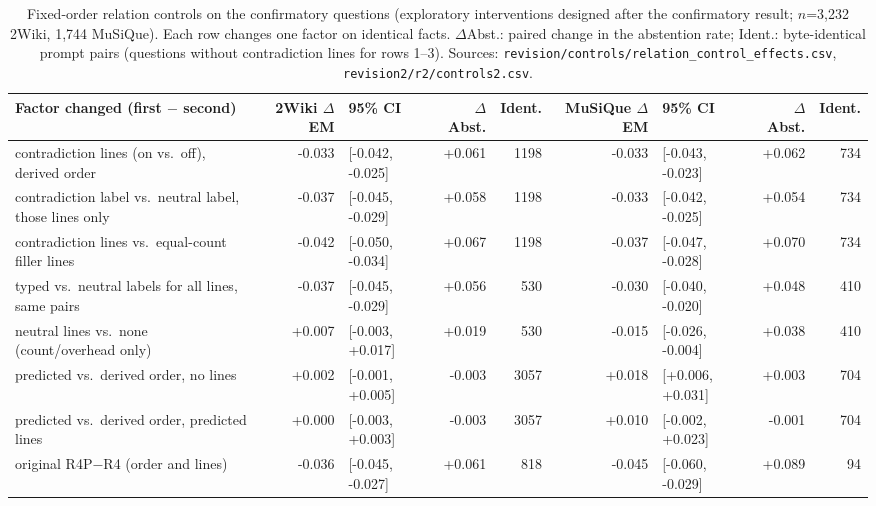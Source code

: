 \begin{table}[t]
\centering
\footnotesize
\begin{adjustbox}{max width=\linewidth}
\begin{tabular}{@{}lrlrrrlrr@{}}
\toprule
Factor changed (first $-$ second) & 2Wiki $\Delta$EM & 95\% CI & $\Delta$Abst. & Ident. & MuSiQue $\Delta$EM & 95\% CI & $\Delta$Abst. & Ident. \\
\midrule
contradiction lines (on vs.\ off), derived order & -0.033 & [-0.042, -0.025] & +0.061 & 1198 & -0.033 & [-0.043, -0.023] & +0.062 & 734 \\
contradiction label vs.\ neutral label, those lines only & -0.037 & [-0.045, -0.029] & +0.058 & 1198 & -0.033 & [-0.042, -0.025] & +0.054 & 734 \\
contradiction lines vs.\ equal-count filler lines & -0.042 & [-0.050, -0.034] & +0.067 & 1198 & -0.037 & [-0.047, -0.028] & +0.070 & 734 \\
typed vs.\ neutral labels for all lines, same pairs & -0.037 & [-0.045, -0.029] & +0.056 & 530 & -0.030 & [-0.040, -0.020] & +0.048 & 410 \\
neutral lines vs.\ none (count/overhead only) & +0.007 & [-0.003, +0.017] & +0.019 & 530 & -0.015 & [-0.026, -0.004] & +0.038 & 410 \\
predicted vs.\ derived order, no lines & +0.002 & [-0.001, +0.005] & -0.003 & 3057 & +0.018 & [+0.006, +0.031] & +0.003 & 704 \\
predicted vs.\ derived order, predicted lines & +0.000 & [-0.003, +0.003] & -0.003 & 3057 & +0.010 & [-0.002, +0.023] & -0.001 & 704 \\
original R4P$-$R4 (order and lines) & -0.036 & [-0.045, -0.027] & +0.061 & 818 & -0.045 & [-0.060, -0.029] & +0.089 & 94 \\
\bottomrule
\end{tabular}
\end{adjustbox}
\caption{Fixed-order relation controls on the confirmatory questions (exploratory interventions designed after the confirmatory result; $n$=3{,}232 2Wiki, 1{,}744 MuSiQue). Each row changes one factor on identical facts. $\Delta$Abst.: paired change in the abstention rate; Ident.: byte-identical prompt pairs (questions without contradiction lines for rows 1--3). Sources: \texttt{revision/\allowbreak controls/\allowbreak relation\_control\_effects.csv}, \texttt{revision2/\allowbreak r2/\allowbreak controls2.csv}.}
\label{tab:controls}
\end{table}
